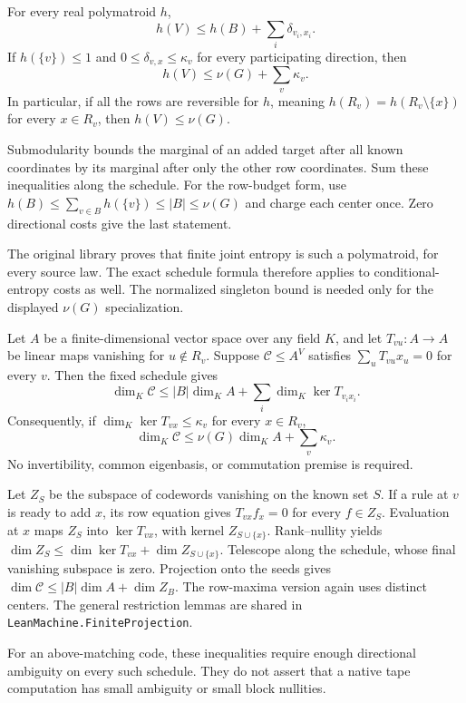\begin{theorem}\label{thm:poly-cost}
For every real polymatroid $h$,
\[
 h(V)\le h(B)+\sum_i\delta_{v_i,x_i}.
\]
If $h(\{v\})\le1$ and $0\le\delta_{v,x}\le\kappa_v$ for every
participating direction, then
\[
 h(V)\le\nu(G)+\sum_v\kappa_v.
\]
In particular, if all the rows are reversible for $h$, meaning
$h(R_v)=h(R_v\setminus\{x\})$ for every $x\in R_v$, then
$h(V)\le\nu(G)$.
\end{theorem}
\begin{outline}
Submodularity bounds the marginal of an added target after all known
coordinates by its marginal after only the other row coordinates.
Sum these inequalities along the schedule. For the row-budget form, use
$h(B)\le\sum_{v\in B}h(\{v\})\le|B|\le\nu(G)$ and charge each center
once. Zero directional costs give the last statement.
\end{outline}
The original library proves that finite joint entropy is such a
polymatroid, for every source law. The exact schedule formula therefore
applies to conditional-entropy costs as well. The normalized singleton
bound is needed only for the displayed $\nu(G)$ specialization.

\begin{theorem}\label{thm:block-cost}
Let $A$ be a finite-dimensional vector space over any field $K$, and let
$T_{vu}:A\to A$ be linear maps vanishing for $u\notin R_v$. Suppose
$\mathcal C\le A^V$ satisfies $\sum_uT_{vu}x_u=0$ for every $v$.
Then the fixed schedule gives
\[
 \dim_K\mathcal C\le |B|\dim_K A+
             \sum_i\dim_K\ker T_{v_i x_i}.
\]
Consequently, if $\dim_K\ker T_{vx}\le\kappa_v$ for every $x\in R_v$,
\[
 \dim_K\mathcal C\le\nu(G)\dim_K A+\sum_v\kappa_v.
\]
No invertibility, common eigenbasis, or commutation premise is required.
\end{theorem}
\begin{outline}
Let $Z_S$ be the subspace of codewords vanishing on the known set $S$.
If a rule at $v$ is ready to add $x$, its row equation gives
$T_{vx}f_x=0$ for every $f\in Z_S$. Evaluation at $x$ maps $Z_S$ into
$\ker T_{vx}$, with kernel $Z_{S\cup\{x\}}$. Rank--nullity yields
$\dim Z_S\le\dim\ker T_{vx}+\dim Z_{S\cup\{x\}}$.
Telescope along the schedule, whose final vanishing subspace is zero.
Projection onto the seeds gives
$\dim\mathcal C\le|B|\dim A+\dim Z_B$. The row-maxima version again
uses distinct centers. The general restriction lemmas are shared in
\texttt{LeanMachine.FiniteProjection}.
\end{outline}
For an above-matching code, these inequalities require enough directional
ambiguity on every such schedule. They do not assert that a native tape
computation has small ambiguity or small block nullities.
